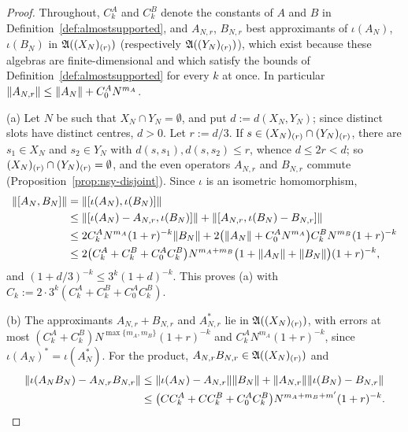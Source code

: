 \begin{proof}
Throughout, $C^A_k$ and $C^B_k$ denote the constants of $A$ and $B$ in Definition~\ref{def:almostsupported}, and
$A_{N,r}$, $B_{N,r}$ best approximants of $\iota(A_N)$, $\iota(B_N)$ in $\mathfrak{A}((X_N)_{(r)})$ (respectively
$\mathfrak{A}((Y_N)_{(r)})$), which exist because these algebras are finite-dimensional and which satisfy the bounds of
Definition~\ref{def:almostsupported} for every $k$ at once. In particular $\lVert A_{N,r}\rVert\le\lVert A_N\rVert+C^A_0N^{m_A}$.

(a) Let $N$ be such that $X_N\cap Y_N=\emptyset$, and put $d:=d(X_N,Y_N)$; since distinct slots have distinct centres,
$d>0$. Let $r:=d/3$. If $s\in(X_N)_{(r)}\cap(Y_N)_{(r)}$, there are $s_1\in X_N$ and $s_2\in Y_N$ with
$d(s,s_1),d(s,s_2)\le r$, whence $d\le2r<d$; so $(X_N)_{(r)}\cap(Y_N)_{(r)}=\emptyset$, and the even operators
$A_{N,r}$ and $B_{N,r}$ commute (Proposition~\ref{prop:nsy-disjoint}). Since $\iota$ is an isometric homomorphism,
\begin{align*}
\lVert[A_N,B_N]\rVert&=\lVert[\iota(A_N),\iota(B_N)]\rVert\\
&\le\lVert[\iota(A_N)-A_{N,r},\iota(B_N)]\rVert+\lVert[A_{N,r},\iota(B_N)-B_{N,r}]\rVert\\
&\le2C^A_kN^{m_A}(1+r)^{-k}\lVert B_N\rVert+2\bigl(\lVert A_N\rVert+C^A_0N^{m_A}\bigr)C^B_kN^{m_B}(1+r)^{-k}\\
&\le2\bigl(C^A_k+C^B_k+C^A_0C^B_k\bigr)N^{m_A+m_B}\bigl(1+\lVert A_N\rVert+\lVert B_N\rVert\bigr)(1+r)^{-k},
\end{align*}
and $(1+d/3)^{-k}\le3^k(1+d)^{-k}$. This proves (a) with $C_k:=2\cdot3^k(C^A_k+C^B_k+C^A_0C^B_k)$.

(b) The approximants $A_{N,r}+B_{N,r}$ and $A_{N,r}^*$ lie in $\mathfrak{A}((X_N)_{(r)})$, with errors at most
$(C^A_k+C^B_k)N^{\max\{m_A,m_B\}}(1+r)^{-k}$ and $C^A_kN^{m_A}(1+r)^{-k}$, since $\iota(A_N)^*=\iota(A_N^*)$. For the
product, $A_{N,r}B_{N,r}\in\mathfrak{A}((X_N)_{(r)})$ and
\begin{align*}
\lVert\iota(A_NB_N)-A_{N,r}B_{N,r}\rVert&\le\lVert\iota(A_N)-A_{N,r}\rVert\lVert B_N\rVert+\lVert A_{N,r}\rVert\lVert\iota(B_N)-B_{N,r}\rVert\\
&\le\bigl(CC^A_k+CC^B_k+C^A_0C^B_k\bigr)N^{m_A+m_B+m'}(1+r)^{-k}.
\end{align*}


\end{proof}

